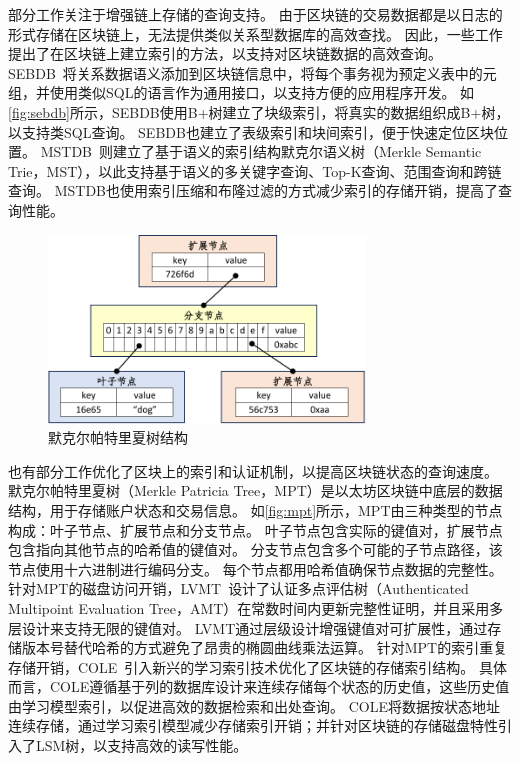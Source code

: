 部分工作关注于增强链上存储的查询支持。
由于区块链的交易数据都是以日志的形式存储在区块链上，无法提供类似关系型数据库的高效查找。
因此，一些工作提出了在区块链上建立索引的方法，以支持对区块链数据的高效查询。
SEBDB~\cite{zhu2019sebdb}将关系数据语义添加到区块链信息中，将每个事务视为预定义表中的元组，并使用类似SQL的语言作为通用接口，以支持方便的应用程序开发。
如\autoref{fig:sebdb}所示，SEBDB使用B+树建立了块级索引，将真实的数据组织成B+树，以支持类SQL查询。
SEBDB也建立了表级索引和块间索引，便于快速定位区块位置。
MSTDB~\cite{zhou2022mstdb}则建立了基于语义的索引结构默克尔语义树（Merkle Semantic Trie，MST），以此支持基于语义的多关键字查询、Top-K查询、范围查询和跨链查询。
MSTDB也使用索引压缩和布隆过滤的方式减少索引的存储开销，提高了查询性能。

\begin{figure}[t]
    \centering
    \includegraphics[width=0.75\textwidth]{figures/timechain/mpt.pdf}
    \caption{默克尔帕特里夏树结构}
    \label{fig:mpt}
\end{figure}

也有部分工作优化了区块上的索引和认证机制，以提高区块链状态的查询速度。
默克尔帕特里夏树（Merkle Patricia Tree，MPT）是以太坊区块链中底层的数据结构，用于存储账户状态和交易信息。
如\autoref{fig:mpt}所示，MPT由三种类型的节点构成：叶子节点、扩展节点和分支节点。
叶子节点包含实际的键值对，扩展节点包含指向其他节点的哈希值的键值对。
分支节点包含多个可能的子节点路径，该节点使用十六进制进行编码分支。
每个节点都用哈希值确保节点数据的完整性。
针对MPT的磁盘访问开销，LVMT~\cite{li2023lvmt}设计了认证多点评估树（Authenticated Multipoint Evaluation Tree，AMT）在常数时间内更新完整性证明，并且采用多层设计来支持无限的键值对。
LVMT通过层级设计增强键值对可扩展性，通过存储版本号替代哈希的方式避免了昂贵的椭圆曲线乘法运算。
针对MPT的索引重复存储开销，COLE~\cite{zhang2024cole}引入新兴的学习索引技术优化了区块链的存储索引结构。
具体而言，COLE遵循基于列的数据库设计来连续存储每个状态的历史值，这些历史值由学习模型索引，以促进高效的数据检索和出处查询。
COLE将数据按状态地址连续存储，通过学习索引模型减少存储索引开销；并针对区块链的存储磁盘特性引入了LSM树，以支持高效的读写性能。

